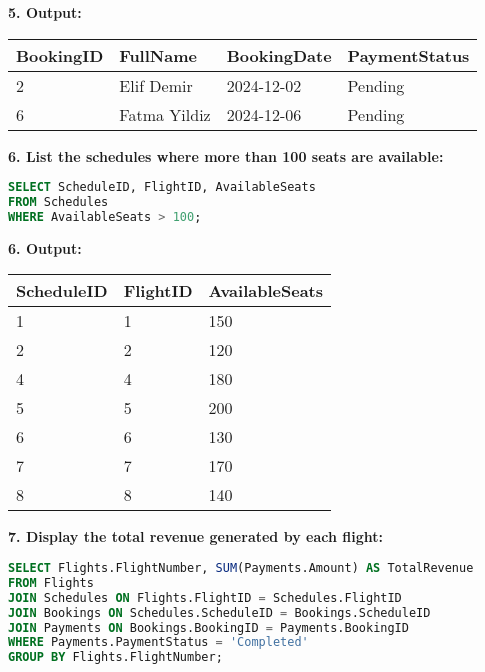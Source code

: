 \documentclass[14pt,a4paper]{extarticle}
\begin{document}
    \textbf{5. Output:}
\begin{table}[h!]
\centering
\begin{tabular}{|l|l|l|l|}
\hline
\textbf{BookingID} & \textbf{FullName}   & \textbf{BookingDate} & \textbf{PaymentStatus} \\ \hline
2                  & Elif Demir         & 2024-12-02           & Pending                \\ \hline
6                  & Fatma Yildiz       & 2024-12-06           & Pending                \\ \hline
\end{tabular}
\end{table}

    \textbf{6. List the schedules where more than 100 seats are available:}
    \begin{lstlisting}[language=SQL, upquote=true]
SELECT ScheduleID, FlightID, AvailableSeats
FROM Schedules
WHERE AvailableSeats > 100;
    \end{lstlisting}
    
    \textbf{6. Output:}
\begin{table}[h!]
\centering
\begin{tabular}{|l|l|l|}
\hline
\textbf{ScheduleID} & \textbf{FlightID} & \textbf{AvailableSeats} \\ \hline
1                   & 1                 & 150                     \\ \hline
2                   & 2                 & 120                     \\ \hline
4                   & 4                 & 180                     \\ \hline
5                   & 5                 & 200                     \\ \hline
6                   & 6                 & 130                     \\ \hline
7                   & 7                 & 170                     \\ \hline
8                   & 8                 & 140                     \\ \hline
\end{tabular}
\end{table}

\newpage

    \textbf{7. Display the total revenue generated by each flight:}
    \begin{lstlisting}[language=SQL, upquote=true]
SELECT Flights.FlightNumber, SUM(Payments.Amount) AS TotalRevenue
FROM Flights
JOIN Schedules ON Flights.FlightID = Schedules.FlightID
JOIN Bookings ON Schedules.ScheduleID = Bookings.ScheduleID
JOIN Payments ON Bookings.BookingID = Payments.BookingID
WHERE Payments.PaymentStatus = 'Completed'
GROUP BY Flights.FlightNumber;
    \end{lstlisting}
\end{document}
